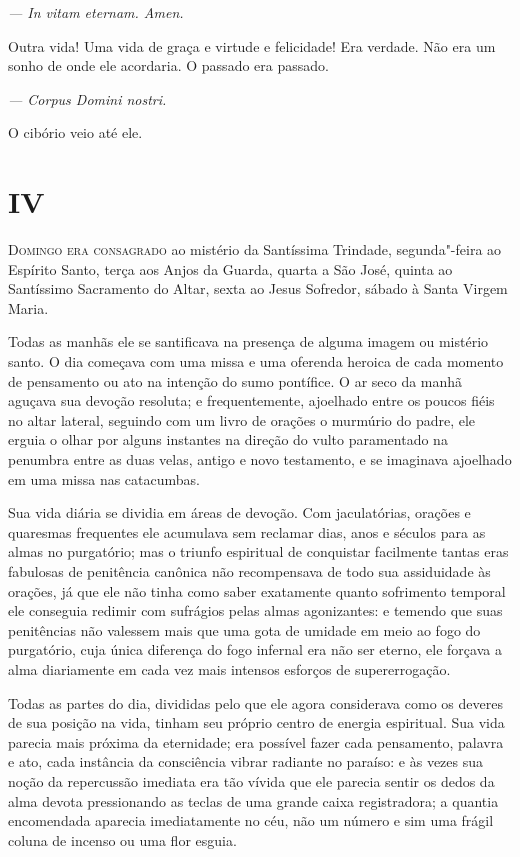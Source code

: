 {\itshape
 --- In vitam eternam. Amen.}

Outra vida! Uma vida de graça e virtude e felicidade! Era verdade. Não
era um sonho de onde ele acordaria. O passado era passado.

{\itshape
 --- Corpus Domini nostri.}

O cibório veio até ele.


\chapter{IV}

\textsc{Domingo era consagrado} ao mistério da Santíssima Trindade, segunda"-feira
ao Espírito Santo, terça aos Anjos da Guarda, quarta a São José, quinta
ao Santíssimo Sacramento do Altar, sexta ao Jesus Sofredor, sábado à
Santa Virgem Maria.

Todas as manhãs ele se santificava na presença de alguma imagem ou
mistério santo. O dia começava com uma missa e uma oferenda heroica de
cada momento de pensamento ou ato na intenção do sumo pontífice. O ar
seco da manhã aguçava sua devoção resoluta; e frequentemente, ajoelhado
entre os poucos fiéis no altar lateral, seguindo com um livro de
orações o murmúrio do padre, ele erguia o olhar por alguns instantes na
direção do vulto paramentado na penumbra entre as duas velas, antigo e
novo testamento, e se imaginava ajoelhado em uma missa nas catacumbas.

Sua vida diária se dividia em áreas de devoção. Com jaculatórias,
orações e quaresmas frequentes ele acumulava sem reclamar dias, anos e
séculos para as almas no purgatório; mas o triunfo espiritual de
conquistar facilmente tantas eras fabulosas de penitência canônica não
recompensava de todo sua assiduidade às orações, já que ele não tinha
como saber exatamente quanto sofrimento temporal ele conseguia redimir
com sufrágios pelas almas agonizantes: e temendo que suas penitências
não valessem mais que uma gota de umidade em meio ao fogo do
purgatório, cuja única diferença do fogo infernal era não ser eterno,
ele forçava a alma diariamente em cada vez mais intensos esforços de
supererrogação.

Todas as partes do dia, divididas pelo que ele agora considerava como os
deveres de sua posição na vida, tinham seu próprio centro de energia
espiritual. Sua vida parecia mais próxima da eternidade; era possível
fazer cada pensamento, palavra e ato, cada instância da consciência
vibrar radiante no paraíso: e às vezes sua noção da repercussão
imediata era tão vívida que ele parecia sentir os dedos da alma devota
pressionando as teclas de uma grande caixa registradora; a quantia
encomendada aparecia imediatamente no céu, não um número e sim uma
frágil coluna de incenso ou uma flor esguia.

